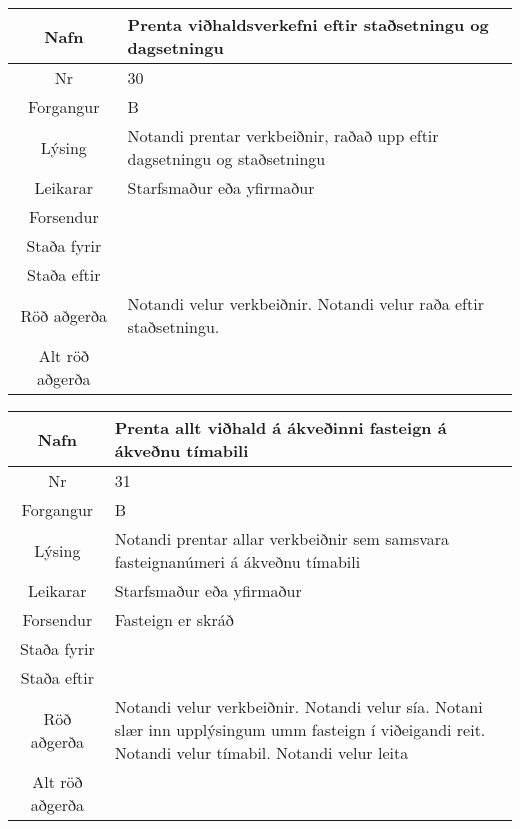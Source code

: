 \caption{Use case 29}\label{tab:use_case_29}
\begin{table}[h!]\centering
\begin{tabular}{|c|p{10cm}|}
\hline
Nafn&Prenta viðhaldsverkefni eftir staðsetningu og dagsetningu\\
\hline
Nr&30\\
\hline
Forgangur&B\\
\hline
Lýsing&Notandi prentar verkbeiðnir, raðað upp eftir dagsetningu og staðsetningu\\
\hline
Leikarar&Starfsmaður eða yfirmaður\\
\hline
Forsendur&\\
\hline
Staða fyrir&\\
\hline
Staða eftir&\\
\hline
Röð aðgerða&Notandi velur verkbeiðnir. Notandi velur raða eftir staðsetningu.\\
\hline
Alt röð aðgerða&\\
\hline
\end{tabular}
\end{table}
\caption{Use case 30}\label{tab:use_case_30}
\begin{table}[h!]\centering
\begin{tabular}{|c|p{10cm}|}
\hline
Nafn&Prenta allt viðhald á ákveðinni fasteign á ákveðnu tímabili\\
\hline
Nr&31\\
\hline
Forgangur&B\\
\hline
Lýsing&Notandi prentar allar verkbeiðnir sem samsvara fasteignanúmeri á ákveðnu tímabili\\
\hline
Leikarar&Starfsmaður eða yfirmaður\\
\hline
Forsendur&Fasteign er skráð\\
\hline
Staða fyrir&\\
\hline
Staða eftir&\\
\hline
Röð aðgerða&Notandi velur verkbeiðnir. Notandi velur sía. Notani slær inn upplýsingum umm fasteign í viðeigandi reit. Notandi velur tímabil. Notandi velur leita\\
\hline
Alt röð aðgerða&\\
\hline
\end{tabular}
\end{table}
\caption{Use case 31}\label{tab:use_case_31}
